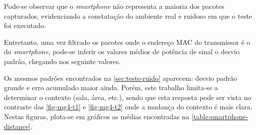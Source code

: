 Pode-se observar que o \emph{smartphone} não representa a maioria dos pacotes
capturados, evidenciando a constatação do ambiente real e ruidoso em que o teste foi
executado.

\clearpage

Entretanto, uma vez filtrado os pacotes onde o endereço MAC do transmissor é o do
\emph{smartphone}, pode-se inferir os valores médios de potência de sinal o desvio padrão, chegando
nos seguinte valores.

\begin{table}[htb]
\end{table}

Os mesmos padrões encontrados na \autoref{sec:teste-ruido} aparecem: desvio
padrão grande e erro acumulado maior ainda. Porém, este trabalho limita-se a determinar o contexto (sala, área, etc.), sendo que esta resposta pode
ser vista no contraste das \autoref{fig-mg4-t1} e \autoref{fig-mg4-t2} onde a
mudança do contexto é mais clara. Nestas figuras, plota-se em gráficos
as médias encontradas na \autoref{table:smartphone-distance}.

